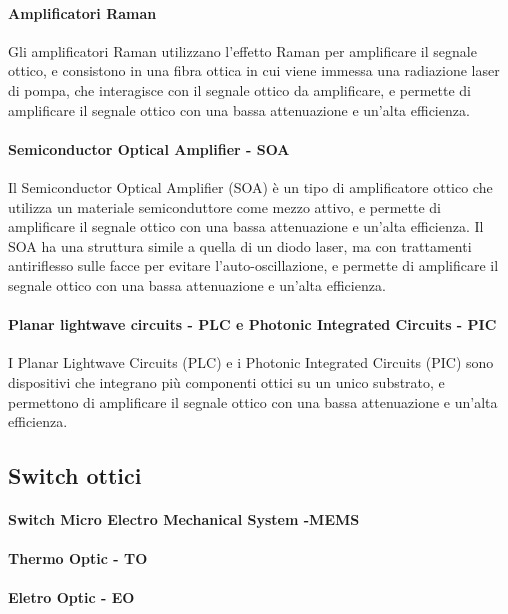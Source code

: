 \paragraph{Amplificatori Raman}
Gli amplificatori Raman utilizzano l'effetto Raman per amplificare il segnale ottico, e consistono in una fibra ottica in cui viene immessa una radiazione laser di pompa, 
che interagisce con il segnale ottico da amplificare, e permette di amplificare il segnale ottico con una bassa attenuazione e un'alta efficienza.\\

\paragraph{Semiconductor Optical Amplifier - SOA}
Il Semiconductor Optical Amplifier (SOA) è un tipo di amplificatore ottico che utilizza un materiale semiconduttore come mezzo attivo, 
e permette di amplificare il segnale ottico con una bassa attenuazione e un'alta efficienza.
Il SOA ha una struttura simile a quella di un diodo laser, ma con trattamenti antiriflesso sulle facce per evitare l'auto-oscillazione, 
e permette di amplificare il segnale ottico con una bassa attenuazione e un'alta efficienza.\\

\paragraph{Planar lightwave circuits - PLC e Photonic Integrated Circuits - PIC}
I Planar Lightwave Circuits (PLC) e i Photonic Integrated Circuits (PIC) sono dispositivi che integrano più componenti ottici su un unico substrato,
e permettono di amplificare il segnale ottico con una bassa attenuazione e un'alta efficienza.
\subsection{Switch ottici}

\paragraph{Switch Micro Electro Mechanical System -MEMS}

\paragraph{Thermo Optic - TO}
\paragraph{Eletro Optic - EO}
